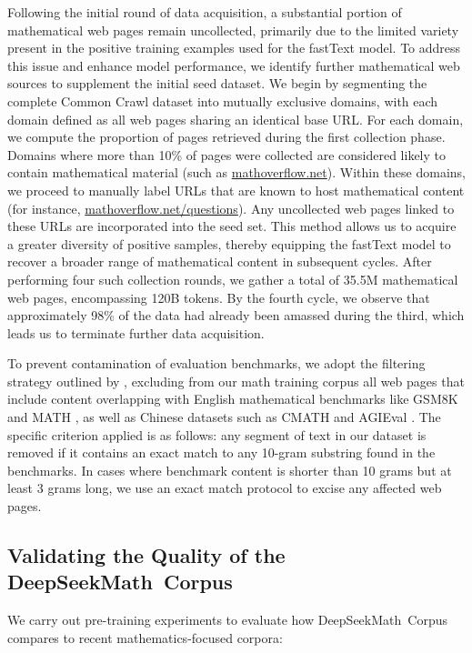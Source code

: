 Following the initial round of data acquisition, a substantial portion of mathematical web pages remain uncollected, primarily due to the limited variety present in the positive training examples used for the fastText model. To address this issue and enhance model performance, we identify further mathematical web sources to supplement the initial seed dataset. We begin by segmenting the complete Common Crawl dataset into mutually exclusive domains, with each domain defined as all web pages sharing an identical base URL. For each domain, we compute the proportion of pages retrieved during the first collection phase. Domains where more than 10\% of pages were collected are considered likely to contain mathematical material (such as \url{mathoverflow.net}). Within these domains, we proceed to manually label URLs that are known to host mathematical content (for instance, \url{mathoverflow.net/questions}). Any uncollected web pages linked to these URLs are incorporated into the seed set. This method allows us to acquire a greater diversity of positive samples, thereby equipping the fastText model to recover a broader range of mathematical content in subsequent cycles. After performing four such collection rounds, we gather a total of 35.5M mathematical web pages, encompassing 120B tokens. By the fourth cycle, we observe that approximately 98\% of the data had already been amassed during the third, which leads us to terminate further data acquisition.

To prevent contamination of evaluation benchmarks, we adopt the filtering strategy outlined by \cite{deepseek-coder}, excluding from our math training corpus all web pages that include content overlapping with English mathematical benchmarks like GSM8K \citep{gsm8k} and MATH \citep{MATH}, as well as Chinese datasets such as CMATH \citep{wei2023cmath} and AGIEval \citep{agieval}. The specific criterion applied is as follows: any segment of text in our dataset is removed if it contains an exact match to any 10-gram substring found in the benchmarks. In cases where benchmark content is shorter than 10 grams but at least 3 grams long, we use an exact match protocol to excise any affected web pages.

\subsection{Validating the Quality of the DeepSeekMath~Corpus}

We carry out pre-training experiments to evaluate how DeepSeekMath~Corpus compares to recent mathematics-focused corpora:

